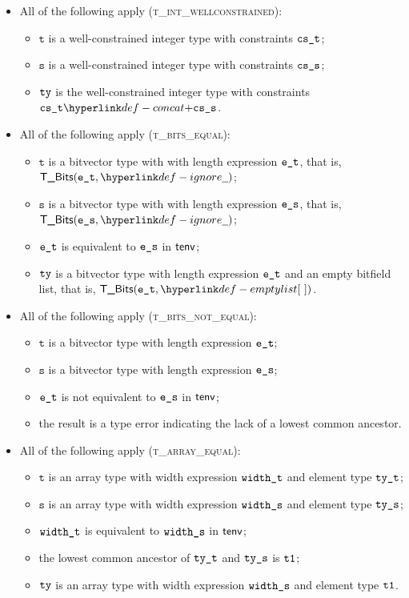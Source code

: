 \documentclass{book}
\newcommand\ProseOrTypeError[0]{\ProseTerminateAs{\TypeErrorConfig}}
\newcommand\vt[0]{\texttt{t}}
\newcommand\vs[0]{\texttt{s}}
\begin{document}
\begin{itemize}
\begin{itemize}
    \item All of the following apply (\textsc{t\_int\_wellconstrained}):
    \begin{itemize}
      \item $\vt$ is a well-constrained integer type with constraints $\texttt{cs\_t}$;
      \item $\vs$ is a well-constrained integer type with constraints $\texttt{cs\_s}$;
      \item $\texttt{ty}$ is the well-constrained integer type with constraints $\cst \concat \css$.
    \end{itemize}

    \item All of the following apply (\textsc{t\_bits\_equal}):
    \begin{itemize}
      \item $\vt$ is a bitvector type with with length expression $\texttt{e\_t}$, that is, $\TBits(\vet, \Ignore)$;
      \item $\vs$ is a bitvector type with with length expression $\texttt{e\_s}$, that is, $\TBits(\ves, \Ignore)$;
      \item $\texttt{e\_t}$ is equivalent to $\texttt{e\_s}$ in $\textsf{tenv}$;
      \item $\texttt{ty}$ is a bitvector type with length expression $\texttt{e\_t}$ and an empty bitfield list, that is, $\TBits(\vet, \emptylist)$.
    \end{itemize}

    \item All of the following apply (\textsc{t\_bits\_not\_equal}):
    \begin{itemize}
      \item $\vt$ is a bitvector type with length expression $\texttt{e\_t}$;
      \item $\vs$ is a bitvector type with length expression $\texttt{e\_s}$;
      \item $\texttt{e\_t}$ is not equivalent to $\texttt{e\_s}$ in $\textsf{tenv}$;
      \item the result is a type error indicating the lack of a lowest common ancestor.
    \end{itemize}

    \item All of the following apply (\textsc{t\_array\_equal}):
    \begin{itemize}
      \item $\vt$ is an array type with width expression $\texttt{width\_t}$ and element type $\texttt{ty\_t}$;
      \item $\vs$ is an array type with width expression $\texttt{width\_s}$ and element type $\texttt{ty\_s}$;
      \item $\texttt{width\_t}$ is equivalent to $\texttt{width\_s}$ in $\textsf{tenv}$;
      \item the lowest common ancestor of $\texttt{ty\_t}$ and $\texttt{ty\_s}$ is $\texttt{t1}$\ProseOrTypeError;
      \item $\texttt{ty}$ is an array type with width expression $\texttt{width\_s}$ and element type $\texttt{t1}$.
    \end{itemize}


\end{itemize}
\end{itemize}
\end{document}
